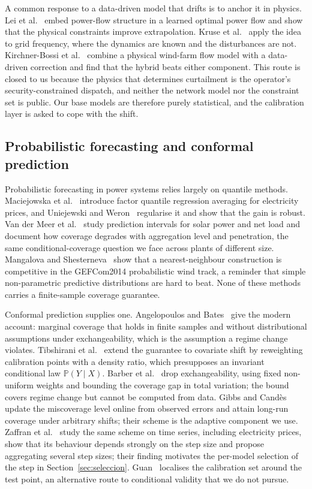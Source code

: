 A common response to a data-driven model that drifts is to anchor it in physics. Lei et al.~\cite{lei2021} embed power-flow structure in a learned optimal power flow and show that the physical constraints improve extrapolation. Kruse et al.~\cite{kruse2023} apply the idea to grid frequency, where the dynamics are known and the disturbances are not. Kirchner-Bossi et al.~\cite{kirchnerbossi2024} combine a physical wind-farm flow model with a data-driven correction and find that the hybrid beats either component. This route is closed to us because the physics that determines curtailment is the operator's security-constrained dispatch, and neither the network model nor the constraint set is public. Our base models are therefore purely statistical, and the calibration layer is asked to cope with the shift.

\subsection{Probabilistic forecasting and conformal prediction}

Probabilistic forecasting in power systems relies largely on quantile methods. Maciejowska et al.~\cite{maciejowska2016} introduce factor quantile regression averaging for electricity prices, and Uniejewski and Weron~\cite{uniejewski2021} regularise it and show that the gain is robust. Van der Meer et al.~\cite{vandermeer2018} study prediction intervals for solar power and net load and document how coverage degrades with aggregation level and penetration, the same conditional-coverage question we face across plants of different size. Mangalova and Shesterneva~\cite{mangalova2016} show that a nearest-neighbour construction is competitive in the GEFCom2014 probabilistic wind track, a reminder that simple non-parametric predictive distributions are hard to beat. None of these methods carries a finite-sample coverage guarantee.

Conformal prediction supplies one. Angelopoulos and Bates~\cite{angelopoulos2023} give the modern account: marginal coverage that holds in finite samples and without distributional assumptions under exchangeability, which is the assumption a regime change violates. Tibshirani et al.~\cite{tibshirani2019} extend the guarantee to covariate shift by reweighting calibration points with a density ratio, which presupposes an invariant conditional law $\mathbb{P}(Y\mid X)$. Barber et al.~\cite{barber2023} drop exchangeability, using fixed non-uniform weights and bounding the coverage gap in total variation; the bound covers regime change but cannot be computed from data. Gibbs and Cand\`es~\cite{gibbs2021} update the miscoverage level online from observed errors and attain long-run coverage under arbitrary shifts; their scheme is the adaptive component we use. Zaffran et al.~\cite{zaffran2022} study the same scheme on time series, including electricity prices, show that its behaviour depends strongly on the step size and propose aggregating several step sizes; their finding motivates the per-model selection of the step in Section~\ref{sec:seleccion}. Guan~\cite{guan2022} localises the calibration set around the test point, an alternative route to conditional validity that we do not pursue.

